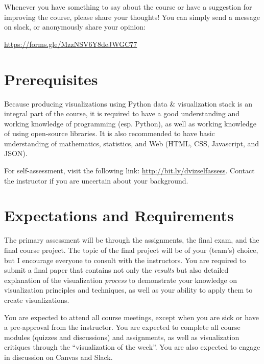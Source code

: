 \documentclass[11pt,article,oneside]{memoir} %
\begin{document}
Whenever you have something to say about the course or have a suggestion for improving the course, please share your thoughts! You can simply send a message on slack, or anonymously share your opinion:

\url{https://forms.gle/MzzNSV6Y8deJWGC77} 

\section{Prerequisites}%
\label{sec:Prerequisites}

Because producing visualizations using Python data \& visualization stack is an integral part of the course, it is required to have a good understanding and working knowledge of programming (esp. Python), as well as working knowledge of using open-source libraries. 
It is also recommended to have basic understanding of mathematics, statistics, and Web (HTML, CSS, Javascript, and JSON). 

For self-assessment, visit the following link: \href{http://bit.ly/dvizselfassess}{http://bit.ly/dvizselfassess}. 
Contact the instructor if you are uncertain about your background. 

\section{Expectations and Requirements}%
\label{sec:requirements}

The primary assessment will be through the assignments, the final exam, and the final course project. 
The topic of the final project will be of your (team's) choice, but I encourage everyone to consult with the instructors. 
You are required to submit a final paper that contains not only the \emph{results} but also detailed explanation of the visualization \emph{process} to demonstrate your knowledge on visualization principles and techniques, as well as your ability to apply them to create visualizations. 

You are expected to attend all course meetings, except when you are sick or have a pre-approval from the instructor. 
You are expected to complete all course modules (quizzes and discussions) and assignments, as well as visualization critiques through the ``visualization of the week''. You are also expected to engage in discussion on Canvas and Slack. 
\end{document}
